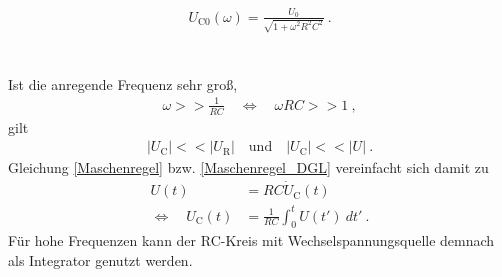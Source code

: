 \begin{align}
	U_{\text{C}0}(\omega) = \frac{U_0}{\sqrt{1+\omega^2R^2C^2}} \ .
\end{align} \\
\ \\
Ist die anregende Frequenz sehr groß, 
\begin{align}
	\omega >> \frac{1}{RC} \quad\Leftrightarrow\quad \omega RC >> 1 \ ,
\end{align}
gilt
\begin{align}
	|U_\text{C}| << |U_\text{R}| \quad \text{und} \quad |U_\text{C}| << |U| \ .
\end{align}
Gleichung \eqref{Maschenregel} bzw. \eqref{Maschenregel_DGL} vereinfacht sich damit zu
\begin{align}
	U(t) &= RC\dot{U}_\text{C}(t) \\
	\Leftrightarrow\quad U_\text{C}(t) &= \frac{1}{RC}\int_0^t U(t')\ dt' \ .
\end{align}
Für hohe Frequenzen kann der RC-Kreis mit Wechselspannungsquelle demnach als Integrator genutzt werden.
